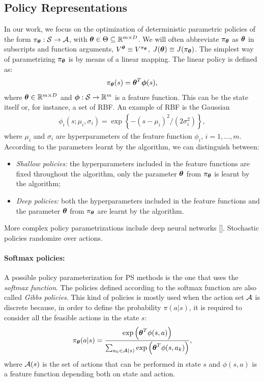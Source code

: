 \subsection{Policy Representations} \label{subsec:polrep}
In our work, we focus on the optimization of deterministic parametric policies of the form $\pi_{\boldsymbol{\theta}}:\mathcal{S}\to\mathcal{A}$, with $\boldsymbol{\theta}\in\Theta\subseteq\mathbb{R}^{m\times D}$. We will often abbreviate $\pi_{\boldsymbol{\theta}}$ as $\boldsymbol{\theta}$ in subscripts and function arguments, \eg $V^{\boldsymbol{\theta}} \equiv V^{\pi_{\boldsymbol{\theta}}}$, $J(\boldsymbol{\theta}) \equiv J(\pi_{\boldsymbol{\theta}})$. The simplest way of parametrizing $\pi_{\boldsymbol{\theta}}$ is by means of a linear mapping. The linear policy is defined as:
\begin{align} \pi_{\boldsymbol{\theta}}(s) = \boldsymbol{\theta}^T\boldsymbol{\phi}(s), \end{align} where $\boldsymbol{\theta}\in\mathbb{R}^{m\times D}$ and $\boldsymbol{\phi}:\mathcal{S}\to\mathbb{R}^m$ is a feature function. This can be the state itself or, for instance, a set of \acf{RBF}. An example of \ac{RBF} is the Gaussian
\begin{align} \phi_i(s; \mu_i, \sigma_i) = \exp\left\{-{(s -\mu_i)^2}\big/{(2\sigma_i^2)}\right\}, \end{align}
where $\mu_i$ and $\sigma_i$ are hyperparameters of the feature function $\phi_i$, $i=1,\dots,m$. According to the parameters learnt by the algorithm, we can distinguish between:
\begin{itemize}
	\item \emph{Shallow policies: }the hyperparameters included in the feature functions are fixed throughout the algorithm, only the parameter $\boldsymbol{\theta}$ from $\pi_{\boldsymbol{\theta}}$ is learnt by the algorithm;
	\item \emph{Deep policies: }both the hyperparameters included in the feature functions and the parameter $\boldsymbol{\theta}$ from $\pi_{\boldsymbol{\theta}}$ are learnt by the algorithm. 
\end{itemize}
More complex policy parametrizations include deep neural networks [\cite{duan2016benchmarking}]. 
Stochastic policies randomize over actions. %

\paragraph{Softmax policies:}
A possible policy parameterization for \ac{PS} methods is the one that uses the \emph{softmax function}. The policies defined according to the softmax function are also called \emph{Gibbs policies}. This kind of policies is mostly used when the action set $\mathcal{A}$ is discrete because, in order to define the probability $\pi(a|s)$, it is required to consider all the feasible actions in the state $s$:
\begin{align}
\pi_{\boldsymbol{\theta}}(a|s) = \frac{\exp\Big(\boldsymbol{\theta}^{T}\phi(s,a)\Big)}{\sum_{a_{k} \in \mathcal{A}(s)}\exp\Big(\boldsymbol{\theta}^{T}\phi(s,a_{k})\Big)},
\end{align}
where $\mathcal{A}(s)$ is the set of actions that can be performed in state $s$ and $\phi(s,a)$ is a feature function depending both on state and action.

